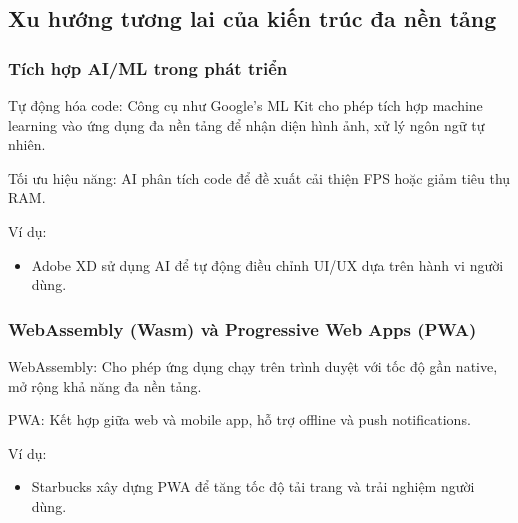 \subsection{Xu hướng tương lai của kiến trúc đa nền tảng}
\renewcommand{\labelitemi}{--}    
  \subsubsection{Tích hợp AI/ML trong phát triển}
    \begin{flushleft}
      \hspace*{0.8cm}Tự động hóa code: Công cụ như Google’s ML Kit cho phép tích hợp machine learning vào ứng dụng đa nền tảng để nhận diện hình ảnh, xử lý ngôn ngữ tự nhiên.
    \end{flushleft}

    \begin{flushleft}
      \hspace*{0.8cm}Tối ưu hiệu năng: AI phân tích code để đề xuất cải thiện FPS hoặc giảm tiêu thụ RAM.
    \end{flushleft}

    \begin{flushleft}
      \hspace*{0.8cm}Ví dụ:
      \setlength{\leftmargini}{1.5cm}
      \begin{itemize}
        \item Adobe XD sử dụng AI để tự động điều chỉnh UI/UX dựa trên hành vi người dùng.
      \end{itemize}
    \end{flushleft}

  \subsubsection{WebAssembly (Wasm) và Progressive Web Apps (PWA)}
    \begin{flushleft}
      \hspace*{0.8cm}WebAssembly: Cho phép ứng dụng chạy trên trình duyệt với tốc độ gần native, mở rộng khả năng đa nền tảng.
    \end{flushleft}

    \begin{flushleft}
      \hspace*{0.8cm}PWA: Kết hợp giữa web và mobile app, hỗ trợ offline và push notifications.
    \end{flushleft}

    \begin{flushleft}
      \hspace*{0.8cm}Ví dụ:
      \setlength{\leftmargini}{1.5cm}
      \begin{itemize}
        \item Starbucks xây dựng PWA để tăng tốc độ tải trang và trải nghiệm người dùng.
      \end{itemize}
    \end{flushleft}

